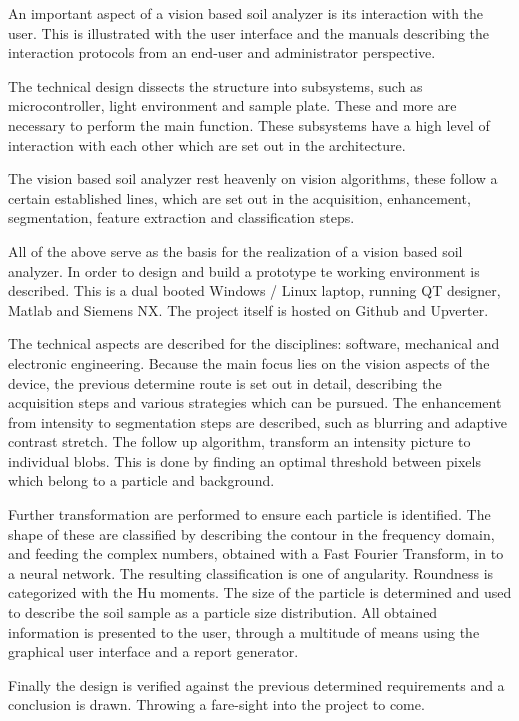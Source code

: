 \documentclass[11pt,fleqn,,a4paper,twoside,openright]{book}
\begin{document}
An important aspect of a vision based soil analyzer is its interaction with the user. This is illustrated with the user interface and the manuals describing the interaction protocols from an end-user and administrator perspective.

The technical design dissects the structure into subsystems, such as microcontroller, light environment and sample plate. These and more are necessary to perform the main function. These subsystems have a high level of interaction with each other which are set out in the architecture. 

The vision based soil analyzer rest heavenly on vision algorithms, these follow a certain established lines, which are set out in the acquisition, enhancement, segmentation, feature extraction and classification steps.

All of the above serve as the basis for the realization of a vision based soil analyzer. In order to design and build a prototype te working environment is described. This is a dual booted Windows / Linux laptop, running QT designer, Matlab and Siemens NX. The project itself is hosted on Github and Upverter.

The technical aspects are described for the disciplines: software, mechanical and electronic engineering. Because the main focus lies on the vision aspects of the device, the previous determine route is set out in detail, describing the acquisition steps and various strategies which can be pursued. The enhancement from intensity to segmentation steps are described, such as blurring and adaptive contrast stretch. The follow up algorithm, transform an intensity picture to individual blobs. This is done by finding an optimal threshold between pixels which belong to a particle and background. 

Further transformation are performed to ensure each particle is identified. The shape of these are classified by describing the contour in the frequency domain, and feeding the complex numbers, obtained with a Fast Fourier Transform, in to a neural network. The resulting classification is one of angularity. Roundness is categorized with the Hu moments. The size of the particle is determined and used to describe the soil sample as a particle size distribution. All obtained information is presented to the user, through a multitude of means using the graphical user interface and a report generator. 

Finally the design is verified against the previous determined requirements and a conclusion is drawn. Throwing a fare-sight into the project to come.
\end{document}
